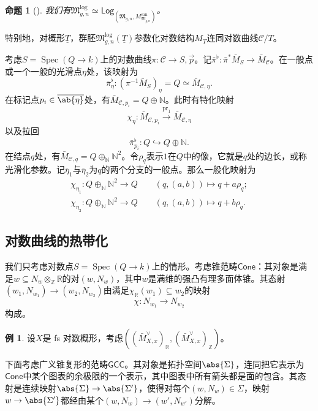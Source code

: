 \documentclass{amsart}
\newtheorem{prop}[thm]{命题}
\theoremstyle{definition}
\newtheorem{exm}[thm]{例}
\theoremstyle{remark}
\theoremstyle{plain}
\theoremstyle{definition}
\theoremstyle{remark}
\newcommand{\N}{\mathbb{N}}
\newcommand{\R}{\mathbb{R}}
\newcommand{\Z}{\mathbb{Z}}
\newcommand{\mc}[1]{\mathcal{#1}}
\newcommand{\mf}[1]{\mathfrak{#1}}
\newcommand{\on}[1]{\operatorname{#1}}
\newcommand{\ms}[1]{\mathsf{#1}}
\newcommand{\ol}[1]{\overline{#1}}
\newcommand{\ul}[1]{\underline{#1}}
\newcommand{\1}{\mathbf{1}}
\newcommand{\2}{\mathbf{2}}
\newcommand{\3}{\mathbf{3}}
\DeclareMathOperator{\Spec}{Spec}
\begin{document}
\begin{prop}[{\cite{FKato2000,Olsson2003}}]
    我们有\(\mf{M}_{g,n}^{\log} \simeq \ms{Log}_{(\mf{M}_{g,n}, M_{\mf{M}_{g,n}}^{\on{can}})}\)。
\end{prop}

特别地，对概形\(\ul{T}\)，群胚\(\mf{M}_{g,n}^{\log}(\ul{T})\)参数化对数结构\(M_T\)连同对数曲线\(\mc{C} / T\)。

考虑\(S = \Spec (Q \to k)\)上的对数曲线\(\pi \colon \mc{C} \to S, \vec{p}\)。记\(\bar{\pi}^{\flat} \colon \bar{\pi}^* \bar{M}_S \to \bar{M}_{\mc{C}}\)。在一般点或一个一般的光滑点\(\eta\)处，该映射为
\[ \bar{\pi}_{\eta}^{\flat} \colon (\pi^{-1} \bar{M}_S)_{\eta} = Q \simeq \bar{M}_{\mc{C}, \eta}. \]
在标记点\(p_i \in \ol{\ab\{\eta\}}\)处，有\(\bar{M}_{\mc{C}, p_i} = Q \oplus \N\)。此时有特化映射
\[ \chi_{\eta} \colon \bar{M}_{\mc{C}, p_i} \xrightarrow{\on{pr}_1} \bar{M}_{\mc{C}, \eta} \]
以及拉回
\[ \bar{\pi}_{p_i}^{\flat} \colon Q \hookrightarrow Q \oplus \N. \]
在结点\(q\)处，有\(\bar{M}_{\mc{C}, q} = Q \oplus_{\N} \N^2\)。令\(\rho_q\)表示\(1\)在\(Q\)中的像，它就是\(q\)处的边长，或称光滑化参数。记\(\bar{\eta}_1\)与\(\bar{\eta}_2\)为\(q\)的两个分支的一般点。那么一般化映射为
\begin{align*}
    \chi_{\eta_1} \colon Q \oplus_{\N} \N^2 \to Q \qquad (q, (a,b)) \mapsto q + a \rho_q ;\\
    \chi_{\eta_2} \colon Q \oplus_{\N} \N^2 \to Q \qquad (q, (a,b)) \mapsto q + b \rho_q .
\end{align*}

\subsection{对数曲线的热带化}%
\label{sub:Tropicalization of log curves}

我们只考虑对数点\(S = \Spec(Q \to k)\)上的情形。考虑锥范畴\(\ms{Cone}\)：其对象是满足\(w \subseteq N_w \otimes_{\Z} \R\)的对\((w, N_w)\)，其中\(w\)是满维的强凸有理多面体锥。其态射\((w_1, N_{w_1}) \to (w_2, N_{w_2})\)由满足\(\chi_{\R}(w_1) \subseteq w_2\)的映射
\[ \chi \colon N_{w_1} \to N_{w_2} \]
构成。

\begin{exm}
    设\(X\)是 fs 对数概形，考虑\(( (\bar{M}_{X,x}^{\vee})_{\R}, (\bar{M}_{X,x}^{\vee})_{\Z} )\)。
\end{exm}

下面考虑广义锥复形的范畴\(\ms{GCC}\)。其对象是拓扑空间\(\abs{\Sigma}\)，连同把它表示为\(\ms{Cone}\)中某个图表的余极限的一个表示，其中图表中所有箭头都是面的包含。其态射是连续映射\(\abs{\Sigma} \to \abs{\Sigma'}\)，使得对每个\((w, N_w) \in \Sigma\)，映射\(w \to \abs{\Sigma'}\)都经由某个\((w, N_w) \to (w', N_{w'})\)分解。
\end{document}
